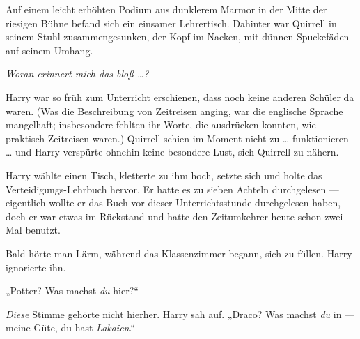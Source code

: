 Auf einem leicht erhöhten Podium aus dunklerem Marmor in der Mitte der riesigen Bühne befand sich ein einsamer Lehrertisch. Dahinter war Quirrell in seinem Stuhl zusammengesunken, der Kopf im Nacken, mit dünnen Spuckefäden auf seinem Umhang.

\emph{Woran erinnert mich das bloß …?}

Harry war so früh zum Unterricht erschienen, dass noch keine anderen Schüler da waren. (Was die Beschreibung von Zeitreisen anging, war die englische Sprache mangelhaft; insbesondere fehlten ihr Worte, die ausdrücken konnten, wie praktisch Zeitreisen waren.) Quirrell schien im Moment nicht zu … funktionieren … und Harry verspürte ohnehin keine besondere Lust, sich Quirrell zu nähern.

Harry wählte einen Tisch, kletterte zu ihm hoch, setzte sich und holte das Verteidigungs-Lehrbuch hervor. Er hatte es zu sieben Achteln durchgelesen — eigentlich wollte er das Buch vor dieser Unterrichtsstunde durchgelesen haben, doch er war etwas im Rückstand und hatte den Zeitumkehrer heute schon zwei Mal benutzt.

Bald hörte man Lärm, während das Klassenzimmer begann, sich zu füllen. Harry ignorierte ihn.

„Potter? Was machst \emph{du} hier?“

\emph{Diese} Stimme gehörte nicht hierher. Harry sah auf.
„Draco? Was machst \emph{du} in — meine Güte, du hast \emph{Lakaien}.“

